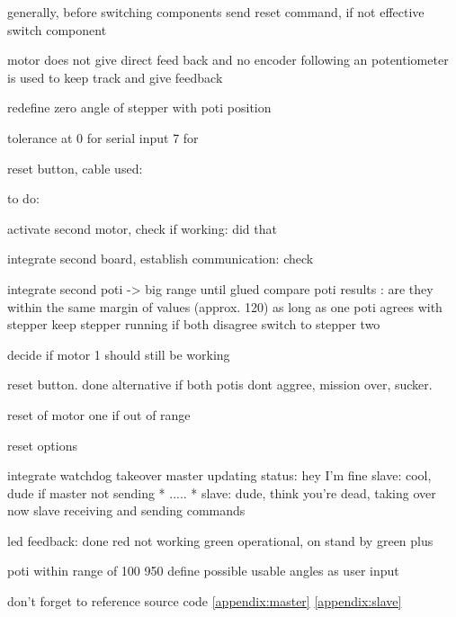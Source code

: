 generally, before switching components send reset command, if not effective switch component


motor does not give direct feed back and no encoder 
following an potentiometer is used to keep track and give feedback


redefine zero angle of stepper with poti position


tolerance  at 0 for serial input
7 for 

reset button, cable used:


to do:


activate second motor, check if working:    did that

integrate second board, establish communication: check

integrate second poti -> big range until glued
compare poti results  :
are they within the same margin of values (approx. 120)
as long as one poti agrees with stepper keep stepper running
if both disagree switch to stepper two

decide if motor 1 should still be working

reset button. done
alternative if both potis dont aggree, mission over, sucker.

reset of motor one if out of range

reset options



integrate watchdog takeover
master updating status: hey I'm fine
slave: cool, dude
if master not sending * ..... *
slave: dude, think you're dead, taking over now
slave receiving and sending commands





led feedback: done
red not working
green operational, on stand by
green plus 






poti within range of 100 950
define possible usable angles as user input




don't forget to reference source code
\ref{appendix:master}
\ref{appendix:slave}